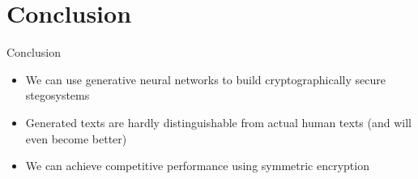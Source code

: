\documentclass[10pt]{beamer}
\begin{document}
    \section{Conclusion}
    
    \begin{frame}{Conclusion}
        \begin{itemize}[<+- | alert@+>]
            \item We can use generative neural networks to build cryptographically secure stegosystems
            \item Generated texts are hardly distinguishable from actual human texts (and will even become better)
            \item We can achieve competitive performance using symmetric encryption
        \end{itemize}
    \end{frame}
    
\end{document}
